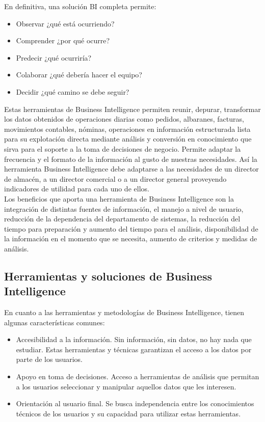 \documentclass[preprint,12pt]{elsarticle}
\begin{document}
	En definitiva, una solución BI completa permite:
	
	\begin{itemize}
		\item Observar ¿qué está ocurriendo?
		\item Comprender ¿por qué ocurre?
		\item Predecir ¿qué ocurriría?
		\item Colaborar ¿qué debería hacer el equipo?
		\item Decidir ¿qué camino se debe seguir?
	\end{itemize}
	
	Estas herramientas de Business Intelligence permiten reunir, depurar, transformar los datos obtenidos de operaciones diarias como pedidos, albaranes, facturas, movimientos contables, nóminas, operaciones en información estructurada lista para su explotación directa mediante análisis y conversión en conocimiento que sirva para el soporte a la toma de decisiones de negocio. Permite adaptar la frecuencia y el formato de la información al gusto de nuestras necesidades. Así la herramienta Business Intelligence debe adaptarse a las necesidades de un director de almacén, a un director comercial o a un director general proveyendo indicadores de utilidad para cada uno de ellos.\\
	
	Los beneficios que aporta una herramienta de Business Intelligence son la integración de distintas fuentes de información, el manejo a nivel de usuario, reducción de la dependencia del departamento de sistemas, la reducción del tiempo para preparación y aumento del tiempo para el análisis, disponibilidad de la información en el momento que se necesita, aumento de criterios y medidas de análisis.
	
	\subsection{Herramientas y soluciones de Business Intelligence}
	En cuanto a las herramientas y metodologías de Business Intelligence, tienen algunas características comunes:
	
	\begin{itemize}
		\item Accesibilidad a la información. Sin información, sin datos, no hay nada que estudiar. Estas herramientas y técnicas garantizan el acceso a los datos por parte de los usuarios.
		\item Apoyo en toma de decisiones. Acceso a herramientas de análisis que permitan a los usuarios seleccionar y manipular aquellos datos que les interesen.
		\item Orientación al usuario final. Se busca independencia entre los conocimientos técnicos de los usuarios y su capacidad para utilizar estas herramientas.
	\end{itemize}
	
\end{document}
